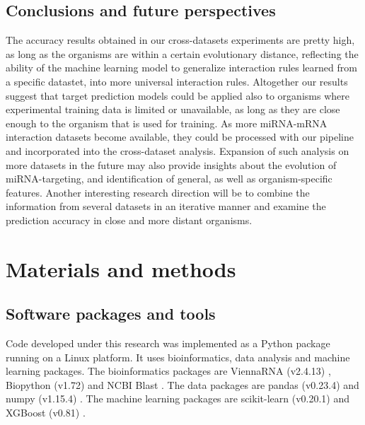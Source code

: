 \documentclass{bmcart}
\begin{document}
\subsection*{Conclusions and future perspectives}
The accuracy results obtained in our cross-datasets experiments are pretty high, as long as the organisms are within a certain evolutionary distance, reflecting the ability of the machine learning model to generalize interaction rules learned from a specific datastet, into more universal interaction rules. Altogether our results suggest that target prediction models could be applied also to organisms where experimental training data is limited or unavailable, as long as they are close enough to the organism that is used for training.
As more miRNA-mRNA interaction datasets become available, they could be processed with our pipeline and incorporated into the cross-dataset analysis. Expansion of such analysis on more datasets in the future may also provide insights about the evolution of miRNA-targeting, and identification of general, as well as organism-specific features. Another interesting research direction will be to combine the information from several datasets in an iterative manner and examine the prediction accuracy in close and more distant organisms.




\clearpage
\section*{Materials and methods}
\subsection*{Software packages and tools}
Code developed under this research was implemented as a Python package running on a Linux platform. It uses bioinformatics, data analysis and machine learning packages. The bioinformatics packages are ViennaRNA (v2.4.13) \cite{lorenz2011viennarna}, Biopython (v1.72) \cite{cock2009biopython} and NCBI Blast \cite{altschul1990basic_blast}. The data packages are pandas (v0.23.4) \cite{mckinney2010data_pandas} and numpy (v1.15.4) \cite{oliphant2006guide_numpy}. The machine learning packages are scikit-learn (v0.20.1) \cite{pedregosa2011scikit} and XGBoost (v0.81) \cite{xgboost}.
\end{document}
